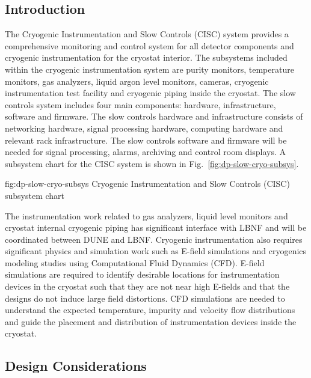 \subsection{Introduction}
\label{sec:fddp-slow-cryo-intro}

The Cryogenic Instrumentation and Slow Controls (CISC) system provides a comprehensive monitoring and control system for all detector components and cryogenic instrumentation for the cryostat interior. The subsystems included within the cryogenic instrumentation system are purity monitors, temperature monitors, gas analyzers, liquid argon level monitors, cameras, cryogenic instrumentation test facility and cryogenic piping inside the cryostat. The slow controls system includes four main components: hardware, infrastructure, software and firmware. The slow controls hardware and infrastructure consists of networking hardware, signal processing hardware, computing hardware and relevant rack infrastructure. The slow controls software and firmware will be needed for signal processing, alarms, archiving and control room displays. A subsystem chart for the CISC system is shown in Fig.\ \ref{fig:dp-slow-cryo-subsys}.

\begin{dunefigure}{fig:dp-slow-cryo-subsys}
{Cryogenic Instrumentation and Slow Controls (CISC) subsystem chart}
\end{dunefigure}

The instrumentation work related to gas analyzers, liquid level
monitors and cryostat internal cryogenic piping has significant
interface with LBNF and will be coordinated between DUNE and LBNF.
Cryogenic instrumentation also requires significant physics and
simulation work such as E-field simulations and cryogenics modeling
studies using Computational Fluid Dynamics (CFD). E-field simulations
are required to identify desirable locations for instrumentation
devices in the cryostat such that they are not near high E-fields and
that the designs do not induce large field distortions. CFD
simulations are needed to understand the expected temperature,
impurity and velocity flow distributions and guide the placement and
distribution of instrumentation devices inside the cryostat.


\subsection{Design Considerations}
\label{sec:fddp-slow-cryo-des-consid}

